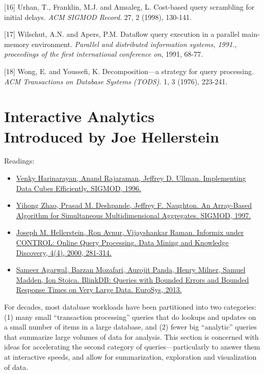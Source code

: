 \documentclass[b5paper,11pt,twoside,openright]{book}
\newcommand\Chapter[3]{
  \hypertarget{#1}{
    \chapter[#2]{#2\\{\Large #3}}\label{#1}
  }
}
\begin{document}
\leavevmode\hypertarget{ref-urhan1998cost}{}%
{[}16{]} Urhan, T., Franklin, M.J. and Amsaleg, L. Cost-based query
scrambling for initial delays. \emph{ACM SIGMOD Record}. 27, 2 (1998),
130-141.

\leavevmode\hypertarget{ref-wilschut1991dataflow}{}%
{[}17{]} Wilschut, A.N. and Apers, P.M. Dataflow query execution in a
parallel main-memory environment. \emph{Parallel and distributed
  information systems, 1991., proceedings of the first international
  conference on}, 1991, 68-77.

\leavevmode\hypertarget{ref-wong1976decomposition}{}%
{[}18{]} Wong, E. and Youssefi, K. Decomposition---a strategy for query
processing. \emph{ACM Transactions on Database Systems (TODS)}. 1, 3
(1976), 223-241.


\Chapter{ch8-interactive}{%
Interactive Analytics
}{%
Introduced by Joe Hellerstein
}

\begin{framed}
Readings:
\begin{itemize}
\item
\href{https://scholar.google.com/scholar?cluster=9112921129698038148}{Venky
  Harinarayan, Anand Rajaraman, Jeffrey D. Ullman. {Implementing Data
    Cubes Efficiently}. {SIGMOD}, 1996.}
\item
\href{https://scholar.google.com/scholar?cluster=1761772586638103323}{Yihong
  Zhao, Prasad M. Deshpande, Jeffrey F. Naughton. {An Array-Based
    Algorithm for Simultaneous Multidimensional Aggregates}. {SIGMOD},
  1997.}
\item
\href{https://scholar.google.com/scholar?cluster=1434575511619007556}{Joseph
  M. Hellerstein, Ron Avnur, Vijayshankar Raman. {Informix under CONTROL:
    Online Query Processing}. {Data Mining and Knowledge Discovery}, 4(4),
  2000, 281-314.}
\item
\href{https://scholar.google.com/scholar?cluster=4916926405792203059}{Sameer
  Agarwal, Barzan Mozafari, Aurojit Panda, Henry Milner, Samuel Madden,
  Ion Stoica. {BlinkDB: Queries with Bounded Errors and Bounded Response
    Times on Very Large Data}. {EuroSys}, 2013.}
\end{itemize}
\end{framed}

For decades, most database workloads have been partitioned into two
categories: (1) many small ``transaction processing'' queries that do
lookups and updates on a small number of items in a large database, and
(2) fewer big ``analytic'' queries that summarize large volumes of data
for analysis. This section is concerned with ideas for accelerating the
second category of queries---particularly to answer them at interactive
speeds, and allow for summarization, exploration and visualization of
data.
\end{document}
